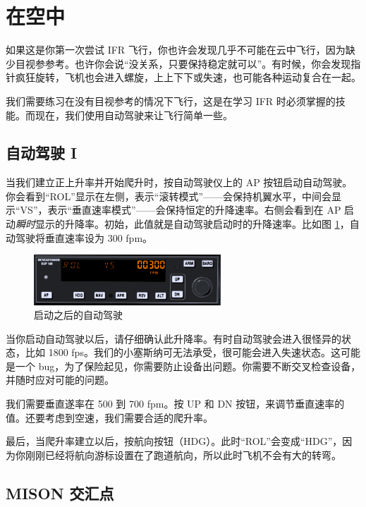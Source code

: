 \section{在空中}

如果这是你第一次尝试 IFR 飞行，你也许会发现几乎不可能在云中飞行，因为缺少目视参参考。也许你会说“没关系，只要保持稳定就可以”。有时候，你会发现指针疯狂旋转，飞机也会进入螺旋，上上下下或失速，也可能各种运动复合在一起。

我们需要练习在没有目视参考的情况下飞行，这是在学习 IFR 时必须掌握的技能。而现在，我们使用自动驾驶来让飞行简单一些。

\subsection{自动驾驶 I}

当我们建立正上升率并开始爬升时，按自动驾驶仪上的 AP 按钮启动自动驾驶。你会看到“ROL”显示在左侧，表示“滚转模式”——会保持机翼水平，中间会显示“VS”，表示“垂直速率模式”——会保持恒定的升降速率。右侧会看到在 AP 启动\emph{瞬时}显示的升降率。初始，此值就是自动驾驶启动时的升降速率。比如图 \ref{fig:ap_vs}，自动驾驶将垂直速率设为 300 fpm。

\begin{figure}
  \begin{center}
    \includegraphics[width=7cm]{img/ap_vs}
    \caption{启动之后的自动驾驶}
    \label{fig:ap_vs}
  \end{center}
\end{figure}

当你启动自动驾驶以后，请仔细确认此升降率。有时自动驾驶会进入很怪异的状态，比如 1800 fps。我们的小塞斯纳可无法承受，很可能会进入失速状态。这可能是一个 bug，为了保险起见，你需要防止设备出问题。你需要不断交叉检查设备，并随时应对可能的问题。

我们需要垂直遂率在 500 到 700 fpm。按 UP 和 DN 按钮，来调节垂直速率的值。还要考虑到空速，我们需要合适的爬升率。

最后，当爬升率建立以后，按航向按钮（HDG）。此时“ROL”会变成“HDG”，因为你刚刚已经将航向游标设置在了跑道航向，所以此时飞机不会有大的转弯。

\subsection{MISON 交汇点}

